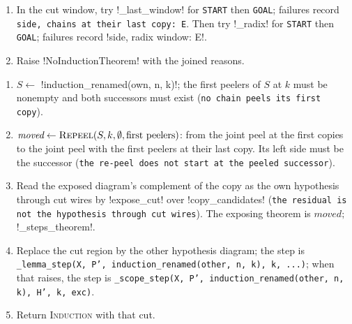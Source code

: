 \begin{algorithm}
\begin{enumerate}
\begin{enumerate}
  \item A \py!NoInductionTheorem!, \py!KernelError!, or \py!InductionDomainError! records \code!label: E! and continues.
  \end{enumerate}
\item In the cut window, try \py!_last_window! for \texttt{START} then \texttt{GOAL}; failures record \texttt{side,\allowbreak{} chains at their last copy: E}. Then try \py!_radix! for \texttt{START} then \texttt{GOAL}; failures record \code!side, radix window: E!.
\item Raise \py!NoInductionTheorem! with the joined reasons.
\end{enumerate}
\end{algorithm}

\begin{algorithm}\label{alg:kernel-last-window}
\begin{enumerate}
\item $S\gets$ \py!induction_renamed(own, n, k)!; the first peelers of $S$ at $k$ must be nonempty and both successors must exist (\texttt{no chain peels its first copy}).
\item $\textit{moved}\gets\textsc{Repeel}(S, k, \emptyset, \text{first peelers})$: from the joint peel at the first copies to the joint peel with the first peelers at their last copy. Its left side must be the successor (\texttt{the re-peel does not start at the peeled successor}).
\item Read the exposed diagram's complement of the copy as the own hypothesis through cut wires by \py!expose_cut! over \py!copy_candidates! (\texttt{the residual is not the hypothesis through cut wires}). The exposing theorem is $\textit{moved}\mathbin{;}$\py!_steps_theorem!.
\item Replace the cut region by the other hypothesis diagram; the step is \texttt{\_\allowbreak{}lemma\_\allowbreak{}step(\allowbreak{}X,\allowbreak{} P',\allowbreak{} induction\_\allowbreak{}renamed(\allowbreak{}other,\allowbreak{} n,\allowbreak{} k),\allowbreak{} k,\allowbreak{} .\allowbreak{}.\allowbreak{}.\allowbreak{})}; when that raises, the step is \texttt{\_\allowbreak{}scope\_\allowbreak{}step(\allowbreak{}X,\allowbreak{} P',\allowbreak{} induction\_\allowbreak{}renamed(\allowbreak{}other,\allowbreak{} n,\allowbreak{} k),\allowbreak{} H',\allowbreak{} k,\allowbreak{} exc)}.
\item Return \textsc{Induction} with that cut.
\end{enumerate}
\end{algorithm}

